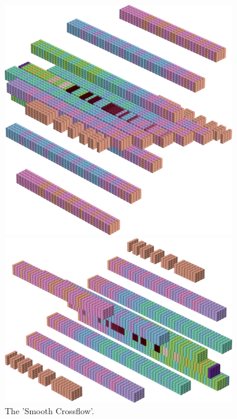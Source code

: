 %
\begin{minipage}[b]{0.48\linewidth}
\begin{figure}[H]
    \centering
    \begin{adjustbox}{width=5cm,margin=0cm 0cm}
      \includegraphics[width=10cm]{src/colorspace_patterns/pattern1-45.png}%
    \end{adjustbox}
    \begin{adjustbox}{width=5cm,margin=0cm 0cm}
      \includegraphics[width=10cm]{src/colorspace_patterns/pattern1-225.png}%
    \end{adjustbox}
\caption{The 'Smooth Crossflow'.}
\end{figure}
\end{minipage}
